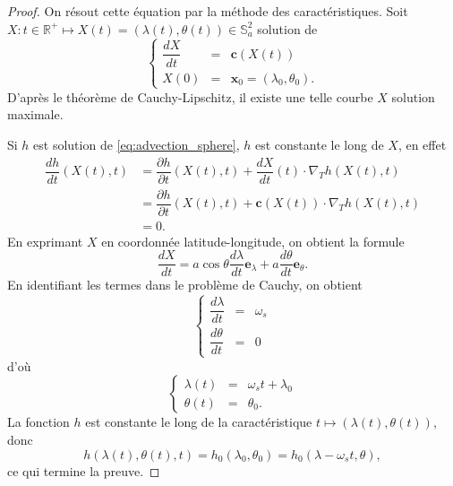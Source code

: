\begin{proof}
On résout cette équation par la méthode des caractéristiques. Soit $X : t \in \mathbb{R}^+ \mapsto X(t)=(\lambda(t), \theta(t)) \in \mathbb{S}_a^2$ solution de 
\begin{equation}
\left\lbrace
\begin{array}{rcl}
\dfrac{dX}{dt} & = & \mathbf{c}(X(t)) \\
X(0) & = & \mathbf{x}_0 = (\lambda_0, \theta_0).
\end{array}
\right.
\label{eq:cauchy_sphere1}
\end{equation}
D'après le théorème de Cauchy-Lipschitz, il existe une telle courbe $X$ solution maximale.

Si $h$ est solution de \eqref{eq:advection_sphere}, $h$ est constante le long de $X$, en effet
\begin{align*}
\dfrac{dh}{dt}(X(t),t) & = \dfrac{\partial h}{\partial t} (X(t),t) + \dfrac{d X}{dt}(t) \cdot \nabla_T h(X(t),t) \\
& = \dfrac{\partial h}{\partial t} (X(t),t) + \mathbf{c}(X(t)) \cdot \nabla_T h(X(t),t) \\
& = 0.
\end{align*}
En exprimant $X$ en coordonnée latitude-longitude, on obtient la formule
\begin{equation}
\dfrac{dX}{dt} = a \cos \theta \dfrac{d \lambda}{dt} \mathbf{e}_{\lambda} + a \dfrac{d \theta}{d t} \mathbf{e}_{\theta}.
\end{equation}
En identifiant les termes dans le problème de Cauchy, on obtient
\begin{equation}
\left\lbrace
\begin{array}{rcl}
\dfrac{d \lambda}{d t} & = & \omega_s \\
\dfrac{d \theta}{d t}  & = & 0
\end{array}
\right.
\end{equation}
d'où
\begin{equation}
\left\lbrace
\begin{array}{rcl}
\lambda(t) & = & \omega_s t + \lambda_0 \\
\theta(t)  & = & \theta_0.
\end{array}
\right.
\end{equation}
La fonction $h$ est constante le long de la caractéristique $t \mapsto (\lambda(t), \theta(t))$, donc
\begin{equation}
h(\lambda(t), \theta(t), t) = h_0(\lambda_0 , \theta_0 ) = h_0(\lambda - \omega_s t, \theta ),
\end{equation}
ce qui termine la preuve.
\end{proof}

